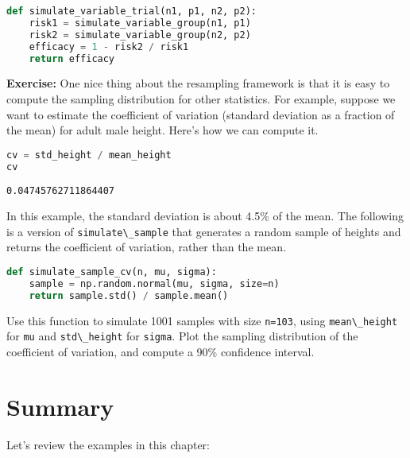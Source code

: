 \begin{lstlisting}[language=Python,style=source]
def simulate_variable_trial(n1, p1, n2, p2):
    risk1 = simulate_variable_group(n1, p1)
    risk2 = simulate_variable_group(n2, p2)
    efficacy = 1 - risk2 / risk1
    return efficacy
\end{lstlisting}

\textbf{Exercise:} One nice thing about the resampling framework is that
it is easy to compute the sampling distribution for other statistics.
For example, suppose we want to estimate the coefficient of variation
(standard deviation as a fraction of the mean) for adult male height.
Here's how we can compute it.

\begin{lstlisting}[language=Python,style=source]
cv = std_height / mean_height
cv
\end{lstlisting}

\begin{lstlisting}[style=output]
0.04745762711864407
\end{lstlisting}

In this example, the standard deviation is about 4.5\% of the mean. The
following is a version of \passthrough{\lstinline!simulate\_sample!}
that generates a random sample of heights and returns the coefficient of
variation, rather than the mean.

\begin{lstlisting}[language=Python,style=source]
def simulate_sample_cv(n, mu, sigma):
    sample = np.random.normal(mu, sigma, size=n)
    return sample.std() / sample.mean()
\end{lstlisting}

Use this function to simulate 1001 samples with size
\passthrough{\lstinline!n=103!}, using
\passthrough{\lstinline!mean\_height!} for \passthrough{\lstinline!mu!}
and \passthrough{\lstinline!std\_height!} for
\passthrough{\lstinline!sigma!}. Plot the sampling distribution of the
coefficient of variation, and compute a 90\% confidence interval.

\section{Summary}\label{summary}

Let's review the examples in this chapter:

